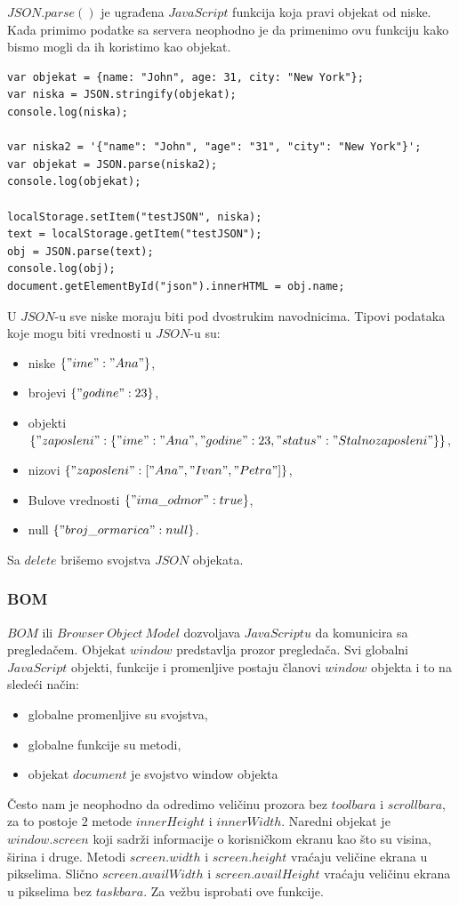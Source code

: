 $JSON.parse()$ je ugrađena $JavaScript$ funkcija koja pravi objekat od niske. Kada primimo podatke sa servera neophodno je da primenimo ovu funkciju kako bismo mogli da ih koristimo kao objekat.
\begin{lstlisting}[backgroundcolor = \color{lightgray}, breaklines=true]
var objekat = {name: "John", age: 31, city: "New York"};
var niska = JSON.stringify(objekat);
console.log(niska);
	
var niska2 = '{"name": "John", "age": "31", "city": "New York"}';
var objekat = JSON.parse(niska2);
console.log(objekat);

localStorage.setItem("testJSON", niska);
text = localStorage.getItem("testJSON");
obj = JSON.parse(text);
console.log(obj);
document.getElementById("json").innerHTML = obj.name;
\end{lstlisting}

U $JSON$-u sve niske moraju biti pod dvostrukim navodnicima. Tipovi podataka koje mogu biti vrednosti u $JSON$-u su:
\begin{itemize}
\item niske $\{ "ime":"Ana" \}$,
\item brojevi $\{ "godine": 23 \}$,
\item objekti $\{
"zaposleni":\{ "ime":"Ana", "godine":23, "status":"Stalno zaposleni" \}
 \}$,
\item nizovi $\{
"zaposleni":[ "Ana", "Ivan", "Petra" ]
\}$,
\item Bulove vrednosti $\{ "ima\_odmor":true \}$,
\item null $\{ "broj\_ormarica":null \}$.
\end{itemize}

Sa $delete$ brišemo svojstva $JSON$ objekata.

\subsubsection{BOM}

$BOM$ ili $Browser\ Object\ Model$ dozvoljava $JavaScriptu$ da komunicira sa pregledačem.
Objekat $window$ predstavlja prozor pregledača. Svi globalni $JavaScript$ objekti, funkcije i promenljive postaju članovi $window$ objekta i to na sledeći način:
\begin{itemize}
\item globalne promenljive su svojstva,
\item globalne funkcije su metodi, 
\item objekat $document$ je svojstvo window objekta
\end{itemize}
Često nam je neophodno da odredimo veličinu prozora bez $toolbara$ i $scrollbara$, za to postoje $2$ metode $innerHeight$ i $innerWidth$.
Naredni objekat je $window.screen$ koji sadrži informacije o korisničkom ekranu kao što su visina, širina i druge. Metodi $screen.width$ i $screen.height$ vraćaju veličine ekrana u pikselima. Slično $screen.availWidth$ i $screen.availHeight$ vraćaju veličinu ekrana u pikselima bez $task bara$. 
Za vežbu isprobati ove funkcije.\\\\

